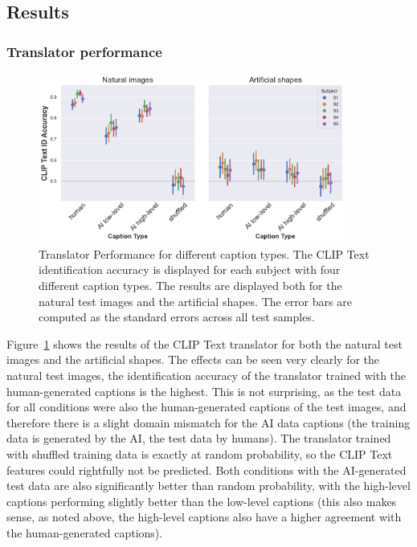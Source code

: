 \subsection{Results}

\subsubsection{Translator performance}

\begin{figure}[ht]
    \centering
    \includegraphics[width=0.9\textwidth]{plots/aicap_translator.png}
    \caption[Experiment 2: Translator performance]{Translator Performance for different caption types. The CLIP Text identification accuracy is displayed for each subject with four different caption types. The results are displayed both for the natural test images and the artificial shapes. The error bars are computed as the standard errors across all test samples.}\label{fig:aicap_translator}
\end{figure}

Figure~\ref{fig:aicap_translator} shows the results of the CLIP Text translator for both the natural test images and the artificial shapes. The effects can be seen very clearly for the natural test images, the identification accuracy of the translator trained with the human-generated captions is the highest. This is not surprising, as the test data for all conditions were also the human-generated captions of the test images, and therefore there is a slight domain mismatch for the AI data captions (the training data is generated by the AI, the test data by humans). The translator trained with shuffled training data is exactly at random probability, so the CLIP Text features could rightfully not be predicted. Both conditions with the AI-generated test data are also significantly better than random probability, with the high-level captions performing slightly better than the low-level captions (this also makes sense, as noted above, the high-level captions also have a higher agreement with the human-generated captions). 

